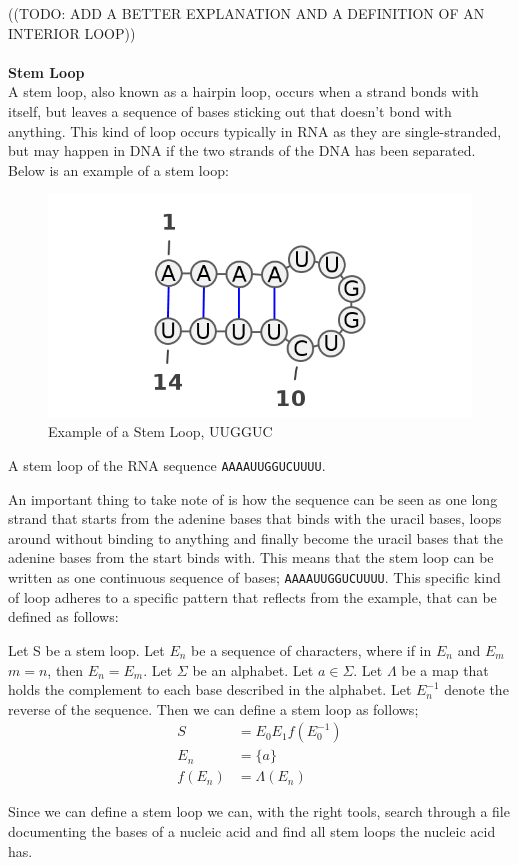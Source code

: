 ((TODO: ADD A BETTER EXPLANATION AND A DEFINITION OF AN INTERIOR LOOP))
\\\\
\textbf{Stem Loop}\\
A stem loop, also known as a hairpin loop, occurs when a strand bonds with 
itself, but leaves a sequence of bases sticking out that doesn't bond with anything. 
This kind of loop occurs typically in RNA as they are single-stranded, but may 
happen in DNA if the two strands of the DNA has been separated. Below is an 
example of a stem loop:
\begin{myex}\centering
\begin{figure}[h!]
\centering
\includegraphics[scale=0.5]{./lib/stem-loop.png}
\caption{Example of a Stem Loop, UUGGUC}
\end{figure}
A stem loop of the RNA sequence {\tt AAAAUUGGUCUUUU}.
\end{myex}
An important thing to take note of is how the sequence can be seen as one 
long strand that starts from the adenine bases that binds with the uracil bases, 
loops around without binding to anything and finally become the uracil bases 
that the adenine bases from the start binds with. This means that the 
stem loop can be written as one continuous sequence of bases; {\tt AAAAUUGGUCUUUU}. 
This specific kind of loop adheres to a specific pattern that reflects from 
the example, that can be defined as follows:
\begin{mydef}
\centering
Let S be a stem loop. Let $E_n$ be a sequence of characters, where if in $E_n$ 
and $E_m$ $m = n$, then $E_n =E_m$. Let $\Sigma$ be an alphabet. Let 
$a \in \Sigma$. Let $\Lambda$ be a map that holds the complement to each base 
described in the alphabet. Let $E_n^{-1}$
denote the reverse of the sequence. Then we can define a stem loop as follows;
\begin{align*}
S      &= E_0 E_1 f(E_0^{-1}) \\
E_n    &= \{a\}\\
f(E_n) &= \Lambda(E_n)
\end{align*}
\end{mydef}
Since we can define a stem loop we can, with the right tools, search through 
a file documenting the bases of a nucleic acid and find all stem loops 
the nucleic acid has.


